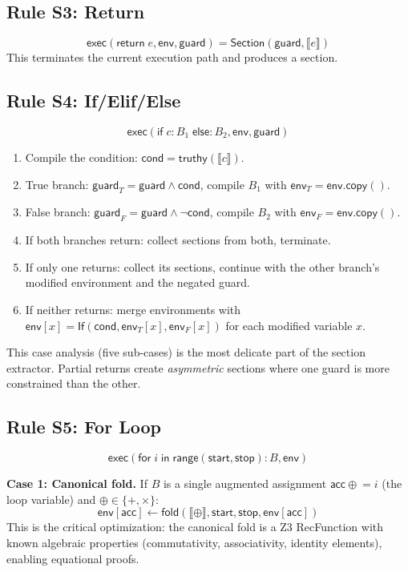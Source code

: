 \documentclass[11pt,a4paper]{report}
\theoremstyle{definition}
\theoremstyle{plain}
\newcommand{\den}[1]{\llbracket #1 \rrbracket}
\newcommand{\fold}{\mathsf{fold}}
\begin{document}
\subsection{Rule S3: Return}
\[
  \mathsf{exec}(\mathsf{return}\; e, \mathsf{env}, \mathsf{guard}) =
    \mathsf{Section}(\mathsf{guard}, \den{e})
\]
This terminates the current execution path and produces a section.

\subsection{Rule S4: If/Elif/Else}
\[
  \mathsf{exec}(\mathsf{if}\; c: B_1\; \mathsf{else}: B_2,
    \mathsf{env}, \mathsf{guard})
\]
\begin{enumerate}
  \item Compile the condition: $\mathsf{cond} = \mathsf{truthy}(\den{c})$.
  \item True branch: $\mathsf{guard}_T = \mathsf{guard} \land
    \mathsf{cond}$, compile $B_1$ with $\mathsf{env}_T = \mathsf{env.copy()}$.
  \item False branch: $\mathsf{guard}_F = \mathsf{guard} \land
    \lnot\mathsf{cond}$, compile $B_2$ with $\mathsf{env}_F = \mathsf{env.copy()}$.
  \item If both branches return: collect sections from both, terminate.
  \item If only one returns: collect its sections, continue with the
    other branch's modified environment and the negated guard.
  \item If neither returns: merge environments with
    $\mathsf{env}[x] = \mathsf{If}(\mathsf{cond}, \mathsf{env}_T[x],
    \mathsf{env}_F[x])$ for each modified variable $x$.
\end{enumerate}
This case analysis (five sub-cases) is the most delicate part of the
section extractor.  Partial returns create \emph{asymmetric} sections
where one guard is more constrained than the other.

\subsection{Rule S5: For Loop}
\[
  \mathsf{exec}(\mathsf{for}\; i\; \mathsf{in}\; \mathsf{range}(
    \mathsf{start}, \mathsf{stop}): B, \mathsf{env})
\]

\textbf{Case 1: Canonical fold.}  If $B$ is a single augmented
assignment $\mathsf{acc} \mathrel{\oplus}= i$ (the loop variable)
and $\oplus \in \{+, \times\}$:
\[
  \mathsf{env}[\mathsf{acc}] \leftarrow \fold(\llbracket \oplus
    \rrbracket, \mathsf{start}, \mathsf{stop}, \mathsf{env}[\mathsf{acc}])
\]
This is the critical optimization: the canonical fold is a Z3
RecFunction with known algebraic properties (commutativity,
associativity, identity elements), enabling equational proofs.
\end{document}

